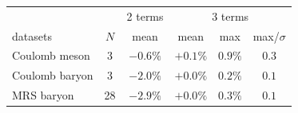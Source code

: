 \begin{center}
\begin{tabular}{lccccc}
\hline\hline
& & 2 terms & \multicolumn{3}{c}{3 terms}\\
datasets & $N$ & mean & mean & max & max/$\sigma$\\
\hline
Coulomb meson & 3 & $-0.6\%$ & $+0.1\%$ & $0.9\%$ & $0.3$\\
Coulomb baryon & 3 & $-2.0\%$ & $+0.0\%$ & $0.2\%$ & $0.1$\\
MRS baryon & 28 & $-2.9\%$ & $+0.0\%$ & $0.3\%$ & $0.1$\\
\hline\hline
\end{tabular}
\end{center}
